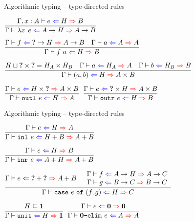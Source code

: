 \documentclass{beamer}
\begin{document}
\begin{frame}{Algorithmic typing -- type-directed rules}

\begin{center}
  $\infrule{\hinting[\extend{\Gamma}{x}{A}]{e}{H}{B}}{\hinting{\fun{x}{e}}{\Fun{A}{H}}{\Fun{A}{B}}}$

  \vspace{2em}

  $\infrule{\hinting{f}{\Fun{\Hole}{H}}{\Fun{A}{B}} \quad \hinting{a}{A}{A}}{\hinting{\app{f}{a}}{H}{B}}$

  \vspace{2em}

  $\infrule{\sidecond{\hintlub{H}{\Prod{\Hole}{\Hole}} = \Prod{H_A}{H_B}} \quad \hinting{a}{H_A}{A} \quad \hinting{b}{H_B}{B}}{\hinting{\pair{a}{b}}{H}{\Prod{A}{B}}}$

  \vspace{2em}

  $\infrule{\hinting{e}{\Prod{H}{\Hole}}{\Prod{A}{B}}}{\hinting{\outl{e}}{H}{A}}$ \quad
  $\infrule{\hinting{e}{\Prod{\Hole}{H}}{\Prod{A}{B}}}{\hinting{\outr{e}}{H}{B}}$
\end{center}

\end{frame}

\begin{frame}{Algorithmic typing -- type-directed rules}

\begin{center}
  $\infrule{\hinting{e}{H}{A}}{\hinting{\inl{e}}{\Sum{H}{B}}{\Sum{A}{B}}}$

  \vspace{2em}

  $\infrule{\hinting{e}{H}{B}}{\hinting{\inr{e}}{\Sum{A}{H}}{\Sum{A}{B}}}$

  \vspace{2em}

  $\infrule{\hinting{e}{\Sum{\Hole}{\Hole}}{\Sum{A}{B}} \quad \begin{array}{c} \hinting{f}{\Fun{A}{H}}{\Fun{A}{C}} \\ \hinting{g}{\Fun{B}{C}}{\Fun{B}{C}} \end{array}}{\hinting{\case{e}{f}{g}}{H}{C}}$

  \vspace{2em}

  $\infrule{\sidecond{\hintorder{H}{\Unit}}}{\hinting{\unit}{H}{\Unit}}$ \quad
  $\infrule{\hinting{e}{\Empty}{\Empty}}{\hinting{\emptyelim{e}}{A}{A}}$
\end{center}

\end{frame}
\end{document}

